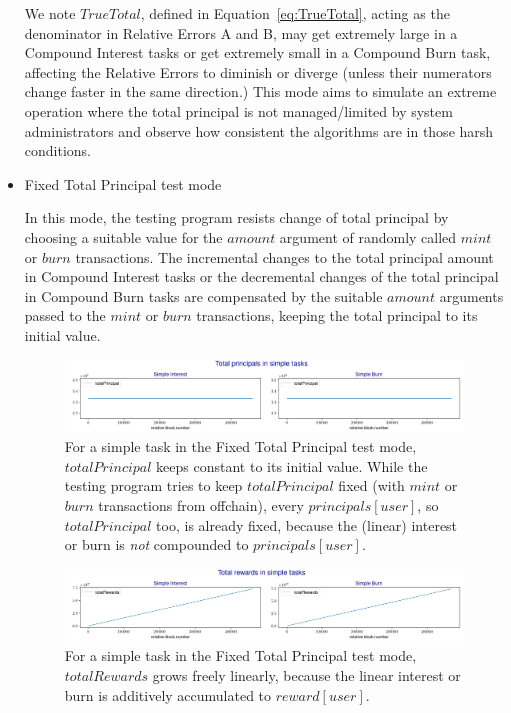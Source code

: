 \documentclass{article}
\begin{document}
\begin{itemize}
  We note $TrueTotal$, defined in Equation~\ref{eq:TrueTotal}, acting as the denominator 
  in Relative Errors A and B, may get extremely large in a Compound Interest tasks
  or get extremely small in a Compound Burn task, 
  affecting the Relative Errors to diminish or diverge (unless their numerators  
  change faster in the same direction.)
  This mode aims to simulate an extreme operation where the total principal is 
  not managed/limited by system administrators and observe how consistent the algorithms 
  are in those harsh conditions.  \newline

  \item {Fixed Total Principal test mode}   \newline

  In this mode, the testing program resists change of total principal by 
  choosing a suitable value for the $amount$ argument of randomly called  
  $mint$ or $burn$ transactions.
  The incremental changes to the total principal amount 
  in Compound Interest tasks or the decremental changes of the total principal 
  in Compound Burn 
  tasks are compensated by the suitable $amount$ arguments 
  passed to the $mint$ or $burn$ transactions, keeping the total principal 
  to its initial value.

  \begin{figure}[H]
    \centering
    \includegraphics[width=5.3in]{images/_6.3_sim_total_principal.jpg}
    \caption{For a simple task in the Fixed Total Principal test mode, 
    $totalPrincipal$ keeps constant to its initial value.
    While the testing program tries to keep $totalPrincipal$ fixed    
    (with $mint$ or $burn$ transactions from offchain),
    every $principals[user]$, so $totalPrincipal$ too, is already fixed, 
    because the (linear) interest or burn is \textit{not} 
    compounded to $principals[user]$.
    }
    \label{fig:fixed_sim_pillars_mode_fixed}
  \end{figure}

  \begin{figure}[H]
    \centering
    \includegraphics[width=5.3in]{images/_6.3_sim_total_rewards.jpg}
    \caption{For a simple task in the Fixed Total Principal test mode,
    $totalRewards$ grows freely linearly, 
    because the 
    linear interest or burn is additively accumulated to $reward[user]$.
    }
    \label{fig:fixed_sim_pillars_mode_fixed}
  \end{figure}


\end{itemize}
\end{document}

